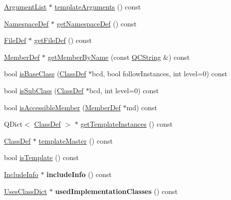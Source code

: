\begin{DoxyCompactItemize}
\item 
\mbox{\hyperlink{class_argument_list}{Argument\+List}} $\ast$ \mbox{\hyperlink{class_class_def_a6e46b01e96d3c49b41f9b883147162bd}{template\+Arguments}} () const
\item 
\mbox{\hyperlink{class_namespace_def}{Namespace\+Def}} $\ast$ \mbox{\hyperlink{class_class_def_a6fa9e94130e102fd87d03dbf761eab44}{get\+Namespace\+Def}} () const
\item 
\mbox{\hyperlink{class_file_def}{File\+Def}} $\ast$ \mbox{\hyperlink{class_class_def_ae3fcef93fb9e95b5e5f9475bf26c5cd9}{get\+File\+Def}} () const
\item 
\mbox{\hyperlink{class_member_def}{Member\+Def}} $\ast$ \mbox{\hyperlink{class_class_def_a43497ce9515e099abcd0e0816ce0d4b6}{get\+Member\+By\+Name}} (const \mbox{\hyperlink{class_q_c_string}{Q\+C\+String}} \&) const
\item 
bool \mbox{\hyperlink{class_class_def_ab43d50a113f1d9c4639181e4c20d4328}{is\+Base\+Class}} (\mbox{\hyperlink{class_class_def}{Class\+Def}} $\ast$bcd, bool follow\+Instances, int level=0) const
\item 
bool \mbox{\hyperlink{class_class_def_a42fef1f090c9113234928afd7cb86507}{is\+Sub\+Class}} (\mbox{\hyperlink{class_class_def}{Class\+Def}} $\ast$bcd, int level=0) const
\item 
bool \mbox{\hyperlink{class_class_def_a04dff8fc6161e680c44b673735654478}{is\+Accessible\+Member}} (\mbox{\hyperlink{class_member_def}{Member\+Def}} $\ast$md) const
\item 
Q\+Dict$<$ \mbox{\hyperlink{class_class_def}{Class\+Def}} $>$ $\ast$ \mbox{\hyperlink{class_class_def_a9da726ec3c85179bc82594908a34afc4}{get\+Template\+Instances}} () const
\item 
\mbox{\hyperlink{class_class_def}{Class\+Def}} $\ast$ \mbox{\hyperlink{class_class_def_aa592db91c3b33a7b4089910f1e987a40}{template\+Master}} () const
\item 
bool \mbox{\hyperlink{class_class_def_a7337a3eb903b689ac256169c6ee34e7b}{is\+Template}} () const
\item 
\mbox{\label{class_class_def_a80409f0aa416aa8f1e2cca6ceab697eb}} 
\mbox{\hyperlink{struct_include_info}{Include\+Info}} $\ast$ {\bfseries include\+Info} () const
\item 
\mbox{\label{class_class_def_ae23e603b4cc9ec10df42798661167a4d}} 
\mbox{\hyperlink{class_uses_class_dict}{Uses\+Class\+Dict}} $\ast$ {\bfseries used\+Implementation\+Classes} () const

\end{DoxyCompactItemize}
